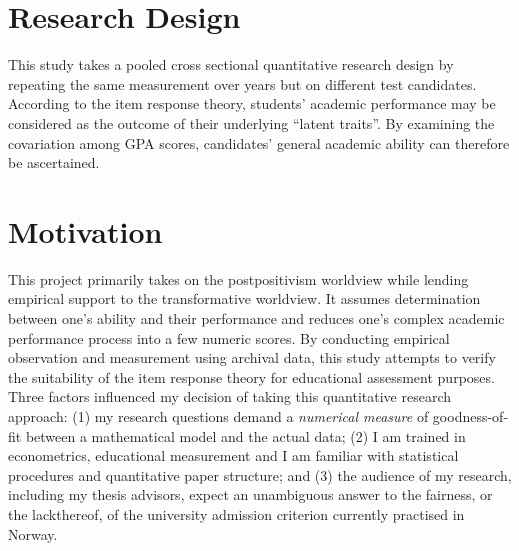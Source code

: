 \documentclass[
    a4paper,            %
    11pt,               %
    stu,                %
    donotrepeattitle,   %
    noextraspace,       %
    floatsintext,       %
    biblatex,           %
    colorlinks=true,        %
    linkcolor=red,          %
    anchorcolor=black,      %
    citecolor=blue,         %
    urlcolor=blue,          %
    bookmarks=true,         %
    bookmarksopen=false,    %
    bookmarksnumbered=true  %
]{apa7}
\begin{document}
\section{Research Design}

This study takes a pooled cross sectional quantitative research design by repeating the same measurement over years but on different test candidates. According to the item response theory, students' academic performance may be considered as the outcome of their underlying ``latent traits''. By examining the covariation among GPA scores, candidates' general academic ability can therefore be ascertained.

\section{Motivation}

This project primarily takes on the postpositivism worldview while lending empirical support to the transformative worldview. It assumes determination between one's ability and their performance and reduces one's complex academic performance process into a few numeric scores. By conducting empirical observation and measurement using archival data, this study attempts to verify the suitability of the item response theory for educational assessment purposes. Three factors influenced my decision of taking this quantitative research approach: (1) my research questions demand a \emph{numerical measure} of goodness-of-fit between a mathematical model and the actual data; (2) I am trained in econometrics, educational measurement and I am familiar with statistical procedures and quantitative paper structure; and (3) the audience of my research, including my thesis advisors, expect an unambiguous answer to the fairness, or the lackthereof, of the university admission criterion currently practised in Norway.
\printbibliography
\end{document}
